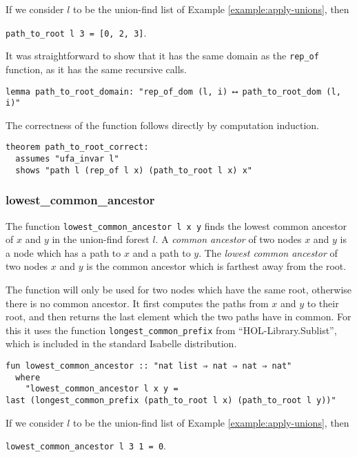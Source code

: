 \begin{exmp}
If we consider $l$ to be the union-find list of Example \ref{example:apply-unions}, then

\lstinline|path_to_root l 3 = [0, 2, 3]|.
\end{exmp}

It was straightforward to show that it has the same domain as the \lstinline{rep_of} function, as it has the same recursive calls.

\begin{lstlisting}
lemma path_to_root_domain: "rep_of_dom (l, i) ⟷ path_to_root_dom (l, i)"
\end{lstlisting}

The correctness of the function follows directly by computation induction.

\begin{lstlisting}
theorem path_to_root_correct:
  assumes "ufa_invar l"
  shows "path l (rep_of l x) (path_to_root l x) x"
\end{lstlisting}

\subsubsection{lowest\_common\_ancestor}

The function \lstinline{lowest_common_ancestor l x y} finds the lowest common ancestor of $x$ and $y$ in the union-find forest $l$.
A \emph{common ancestor} of two nodes $x$ and $y$ is a node which has a path to $x$ and a path to $y$.
The \emph{lowest common ancestor} of two nodes $x$ and $y$ is the common ancestor which is farthest away from the root.

The function will only be used for two nodes which have the same root, otherwise there is no common ancestor. It first computes the paths from $x$ and $y$ to their root, and then returns the last element which the two paths have in common. For this it uses the function \lstinline{longest_common_prefix} from ``HOL-Library.Sublist'', which is included in the standard Isabelle distribution.

\begin{lstlisting}
fun lowest_common_ancestor :: "nat list ⇒ nat ⇒ nat ⇒ nat"
  where
    "lowest_common_ancestor l x y =
last (longest_common_prefix (path_to_root l x) (path_to_root l y))"
\end{lstlisting}

\begin{exmp}
If we consider $l$ to be the union-find list of Example \ref{example:apply-unions}, then

\lstinline|lowest_common_ancestor l 3 1 = 0|.
\end{exmp}

